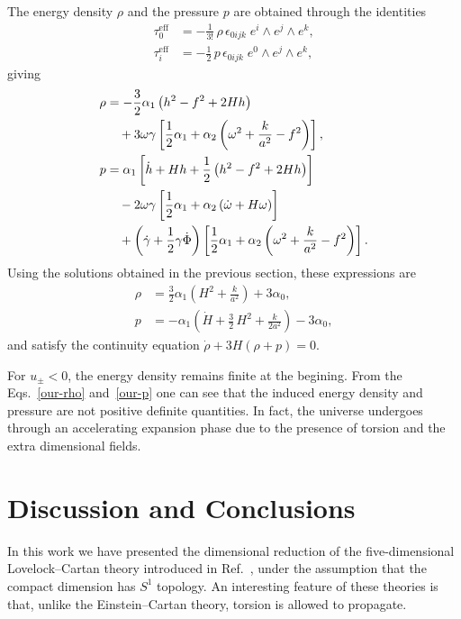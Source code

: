 \documentclass[aps,prd,12pt,superscriptaddress,showpacs,showkeys,reprint,nofootinbib]{revtex4-1}
\begin{document}
The energy density $\rho$ and the pressure $p$ are obtained through the identities
\begin{align}
  \tau_0^{\mathrm{eff}} &= -\frac{1}{3!} \, \rho \, \epsilon_{0ijk} \; e^i\wedge e^j\wedge e^k,\\
  \tau_i^{\mathrm{eff}} &= -\frac{1}{2} \,p \, \epsilon_{0ijk} \; e^0\wedge e^j\wedge e^k,
\end{align} 
giving
\begin{align}
  \label{rho}
  \rho &= -\frac{3}{2}\alpha_1\left(h^2-f^2+2Hh\right) \\
  & \quad + 3\omega\gamma\left[\frac{1}{2}\alpha_1+\alpha_2\left(\omega^2+\frac{k}{a^2}-f^2\right)\right], \notag
  \\
  \label{presion}
  p &= \alpha_1\left[\dot{h}+Hh+\frac{1}{2}\left(h^2-f^2+2Hh\right)\right]\\
  & \quad - 2\omega\gamma\left[\frac{1}{2}\alpha_1+\alpha_2\left(\dot{\omega}+H\omega\right)\right]\notag\\
  & \quad +\left(\dot{\gamma}+\frac{1}{2}\gamma\dot{\Phi}\right)\left[\frac{1}{2}\alpha_1+\alpha_2\left(\omega^2+\frac{k}{a^2}-f^2\right)\right]. \notag
\end{align}
Using the solutions obtained in the previous section, these expressions are
\begin{align}
  \label{our-rho}
  \rho &= \frac{3}{2}\alpha_1\left(H^2 + \frac{k}{a^2}\right) + 3\alpha_0, \\
  \label{our-p}
  p &= -\alpha_1\left(\dot{H} + \frac{3}{2}\,H^2 + \frac{k}{2a^2}\right) - 3\alpha_0,
\end{align}
and satisfy the continuity equation $\dot{\rho}+3H\left(\rho+p\right)=0$. 

For $u_\pm<0$, the energy density remains finite at the begining. From the Eqs.~\eqref{our-rho} and~\eqref{our-p} one can see that the induced energy density and pressure are not positive definite quantities. In fact, the universe undergoes through an accelerating expansion phase due to the presence of torsion and the extra dimensional fields. 


\section{Discussion and Conclusions\label{conclusions}}

In this work we have presented the dimensional reduction of the
five-dimensional Lovelock--Cartan theory introduced in
Ref.~\cite{Mardones:1990qc}, under the assumption that the compact
dimension has $S^1$ topology. An interesting feature of these theories
is that, unlike the Einstein--Cartan theory, torsion is allowed to
propagate.
\end{document}
